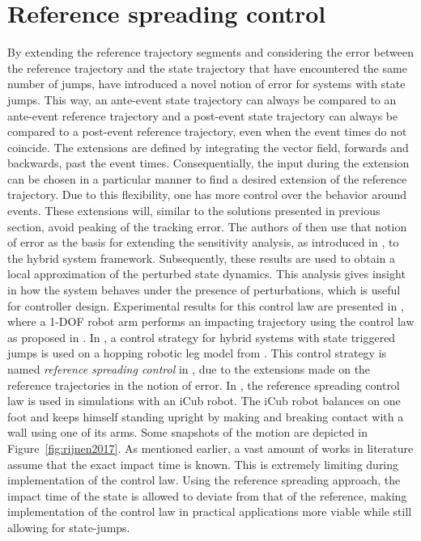 \documentclass[../DC2019003Bouma.tex]{subfiles}
\begin{document}
\section{Reference spreading control}
By extending the reference trajectory segments and considering the error between the reference trajectory and the state trajectory that have encountered the same number of jumps, \cite{Saccon2014,Rijnen2015} have introduced a novel notion of error for systems with state jumps. This way, an ante-event state trajectory can always be compared to an ante-event reference trajectory and a post-event state trajectory can always be compared to a post-event reference trajectory, even when the event times do not coincide. The extensions are defined by integrating the vector field, forwards and backwards, past the event times. Consequentially, the input during the extension can be chosen in a particular manner to find a desired extension of the reference trajectory. Due to this flexibility, one has more control over the behavior around events. These extensions will, similar to the solutions presented in previous section, avoid peaking of the tracking error. The authors of \cite{Saccon2014,Rijnen2015} then use that notion of error as the basis for extending the sensitivity analysis, as introduced in \cite{Khalil1996}, to the hybrid system framework. Subsequently, these results are used to obtain a local approximation of the perturbed state dynamics. This analysis gives insight in how the system behaves under the presence of perturbations, which is useful for controller design. Experimental results for this control law are presented in \cite{Incremona2015}, where a 1-DOF robot arm performs an impacting trajectory using the control law as proposed in \cite{Saccon2014}. In \cite{Rijnen2016}, a control strategy for hybrid systems with state triggered jumps is used on a hopping robotic leg model from \cite{Tsagarakis2013}. This control strategy is named \textit{reference spreading control} in \cite{Rijnen2017}, due to the extensions made on the reference trajectories in the notion of error. In \cite{Rijnen2017a}, the reference spreading control law is used in simulations with an iCub robot. The iCub robot balances on one foot and keeps himself standing upright by making and breaking contact with a wall using one of its arms. Some snapshots of the motion are depicted in Figure~\ref{fig:rijnen2017}. As mentioned earlier, a vast amount of works in literature assume that the exact impact time is known. This is extremely limiting during implementation of the control law. Using the reference spreading approach, the impact time of the state is allowed to deviate from that of the reference, making implementation of the control law in practical applications more viable while still allowing for state-jumps.
\end{document}
